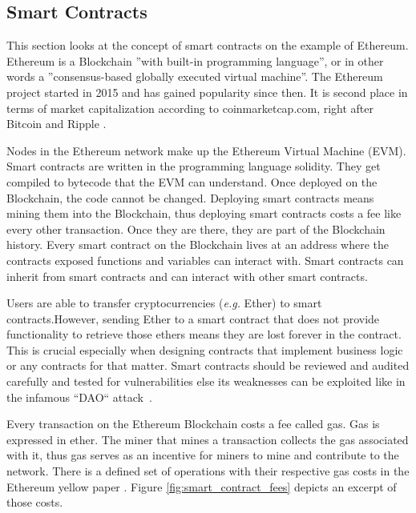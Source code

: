 \subsection{Smart Contracts}
\label{subsec:02_smart_contracts}

This section looks at the concept of smart contracts on the example of Ethereum.
Ethereum is a Blockchain ''with built-in programming language'', or in other words a ''consensus-based globally executed virtual machine''.
The Ethereum project started in 2015 and has gained popularity since then. It is second place in terms of market capitalization according to coinmarketcap.com, right after Bitcoin and Ripple \cite{coinmarketcap}.

Nodes in the Ethereum network make up the Ethereum Virtual Machine (EVM). Smart contracts are written in the programming language solidity. They get compiled to bytecode that the EVM can understand.
Once deployed on the Blockchain, the code cannot be changed. Deploying smart contracts means mining them into the Blockchain, thus deploying smart contracts costs a fee like every other transaction. Once they are there, they are part of the Blockchain history. Every smart contract on the Blockchain lives at an address where the contracts exposed functions and variables can interact with. Smart contracts can inherit from smart contracts and can interact with other smart contracts.

Users are able to transfer cryptocurrencies (\textit{e.g.} Ether) to smart contracts.However, sending Ether to a smart contract that does not provide functionality to retrieve those ethers means they are lost forever in the contract. This is crucial especially when designing contracts that implement business logic or any contracts for that matter. Smart contracts should be reviewed and audited carefully and tested for vulnerabilities else its weaknesses can be exploited like in the infamous ``DAO`` attack~\cite{DoaAttack}.

Every transaction on the Ethereum Blockchain costs a fee called gas. Gas is expressed in ether. The miner that mines a transaction collects the gas associated with it, thus gas serves as an incentive for miners to mine and contribute to the network. There is a defined set of operations with their respective gas costs in the Ethereum yellow paper \cite{ethereumyellowpaer}.
Figure \ref{fig:smart_contract_fees} depicts an excerpt of those costs.

